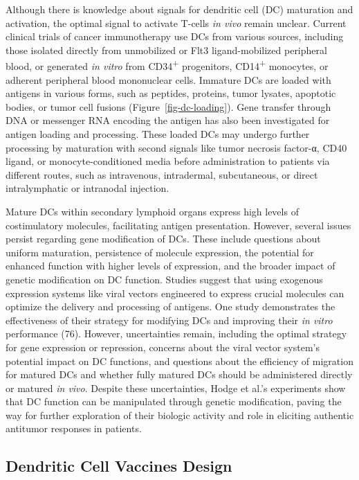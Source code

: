 \documentclass[
]{article}
\begin{document}
Although there is knowledge about signals for dendritic cell (DC)
maturation and activation, the optimal signal to activate T-cells
\emph{in vivo} remain unclear. Current clinical trials of cancer
immunotherapy use DCs from various sources, including those isolated
directly from unmobilized or Flt3 ligand-mobilized peripheral blood, or
generated \emph{in vitro} from CD34\textsuperscript{+} progenitors,
CD14\textsuperscript{+} monocytes, or adherent peripheral blood
mononuclear cells. Immature DCs are loaded with antigens in various
forms, such as peptides, proteins, tumor lysates, apoptotic bodies, or
tumor cell fusions (Figure~\ref{fig-dc-loading}). Gene transfer through
DNA or messenger RNA encoding the antigen has also been investigated for
antigen loading and processing. These loaded DCs may undergo further
processing by maturation with second signals like tumor necrosis
factor-α, CD40 ligand, or monocyte-conditioned media before
administration to patients via different routes, such as intravenous,
intradermal, subcutaneous, or direct intralymphatic or intranodal
injection.

Mature DCs within secondary lymphoid organs express high levels of
costimulatory molecules, facilitating antigen presentation. However,
several issues persist regarding gene modification of DCs. These include
questions about uniform maturation, persistence of molecule expression,
the potential for enhanced function with higher levels of expression,
and the broader impact of genetic modification on DC function. Studies
suggest that using exogenous expression systems like viral vectors
engineered to express crucial molecules can optimize the delivery and
processing of antigens. One study demonstrates the effectiveness of
their strategy for modifying DCs and improving their \emph{in vitro}
performance (76). However, uncertainties remain, including the optimal
strategy for gene expression or repression, concerns about the viral
vector system's potential impact on DC functions, and questions about
the efficiency of migration for matured DCs and whether fully matured
DCs should be administered directly or matured \emph{in vivo}. Despite
these uncertainties, Hodge et al.'s experiments show that DC function
can be manipulated through genetic modification, paving the way for
further exploration of their biologic activity and role in eliciting
authentic antitumor responses in patients.

\subsection{Dendritic Cell Vaccines
Design}\label{dendritic-cell-vaccines-design}
\end{document}
